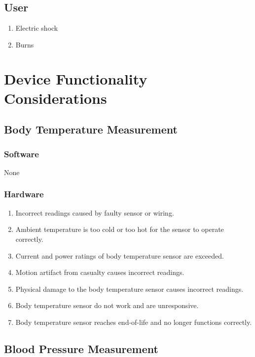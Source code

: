 \documentclass{article}
\begin{document}
    \subsection{User}
    \begin{enumerate}[label = (\alph*) ] 
        \item Electric shock
        \item Burns
    \end{enumerate}
    
    \section{Device Functionality Considerations}
    
    \subsection{Body Temperature Measurement}
        \subsubsection{Software} 
        \noindent
        None
        \subsubsection{Hardware}
        \begin{enumerate}[label = (\alph*) ] 
            \item Incorrect readings caused by faulty sensor or wiring.
            \item Ambient temperature is too cold or too hot for the sensor to operate correctly.
            \item Current and power ratings of body temperature sensor are exceeded.
            \item Motion artifact from casualty causes incorrect readings.
            \item Physical damage to the body temperature sensor causes incorrect readings.
            \item Body temperature sensor do not work and are unresponsive.
            \item Body temperature sensor reaches end-of-life and no longer functions correctly.
        \end{enumerate}
    \subsection{Blood Pressure Measurement}
\end{document}
